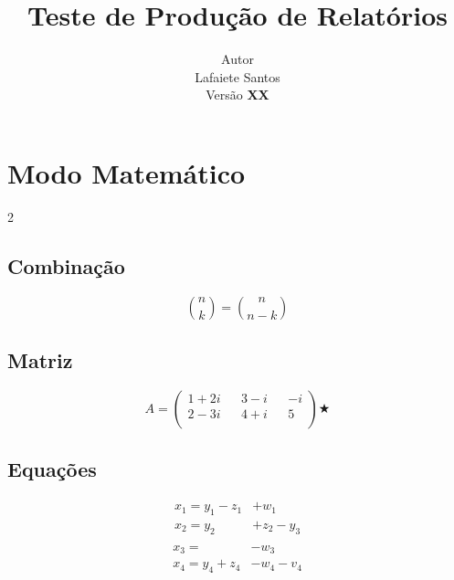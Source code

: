 \documentclass[12pt,a4paper]{article}
\author{Autor \\ Lafaiete Santos \\ Versão \textbf{XX}}
\title{\textbf{Teste de Produção de Relatórios}}
\date{}
\begin{document}
\maketitle

\section*{\Huge Modo Matemático}
\vspace{1cm}

\begin{multicols}{2}

\subsection{Combinação}
$$ {n \choose k} = {n \choose n-k}$$

\subsection{Matriz}
$$A=\begin{pmatrix}
1+2i&&3-i&&-i\\
2-3i&&4+i&&5\\
\end{pmatrix}\bigstar$$
\end{multicols}
\vspace{1cm}

\subsection{Equações}
\begin{equation}
\begin{split}
x_1=y_1-z_1&+w_1\\
x_2=y_2&+z_2-y_3\\
\end{split}
\end{equation}
\begin{equation}
\begin{split}
x_3=&-w_3\\
x_4=y_4+z_4&-w_4-v_4\\
\end{split}
\end{equation}
\vspace{1cm}
\end{document}
